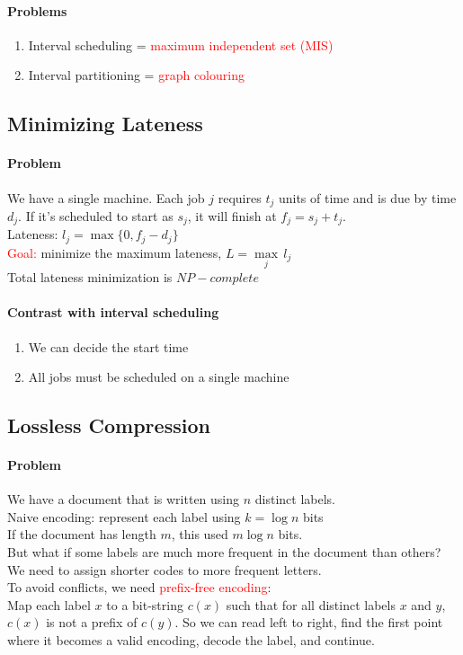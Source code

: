 \documentclass[11pt]{article}
\begin{document}
\paragraph{Problems}
\begin{enumerate}
	\item Interval scheduling = \textcolor{red}{maximum independent set (MIS)}
	\item Interval partitioning = \textcolor{red}{graph colouring}
\end{enumerate}

\subsection{Minimizing Lateness}
\paragraph{Problem}
We have a single machine. Each job $j$ requires $t_j$ units of time and is due by time $d_j$. If it's scheduled to start as $s_j$, it will finish at $f_j = s_j + t_j$.\\
Lateness: $l_j = \max\{0, f_j - d_j\}$\\
\textcolor{red}{Goal:} minimize the maximum lateness, $L = \underset{j}{\max} \,l_j$ \\
Total lateness minimization is $NP-complete$

\paragraph{Contrast with interval scheduling}
\begin{enumerate}
	\item We can decide the start time
	\item All jobs must be scheduled on a single machine
\end{enumerate}

\subsection{Lossless Compression}
\paragraph{Problem}
We have a document that is written using $n$ distinct labels. \\
Naive encoding: represent each label using $k = \log n$ bits \\
If the document has length $m$, this used $m \log n$ bits. \\
But what if some labels are much more frequent in the document than others? We need to assign shorter codes to more frequent letters. \\
To avoid conflicts, we need \textcolor{red}{prefix-free encoding}: \\
Map each label $x$ to a bit-string $c(x)$ such that for all distinct labels $x$ and $y$, $c(x)$ is not a prefix of $c(y)$. So we can read left to right, find the first point where it becomes a valid encoding, decode the label, and continue.
\end{document}
